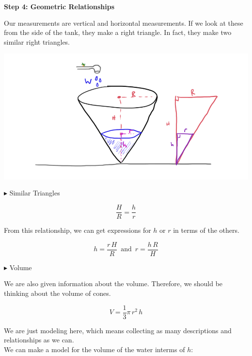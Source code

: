 \documentclass{ximera}
\begin{document}
\textbf{\textcolor{purple!85!blue}{Step 4: Geometric Relationships}}


Our measurements are vertical and horizontal measurements.  If we look at these from the side of the tank, they make a right triangle.  In fact, they make two similar right triangles.






\begin{image}
\includegraphics{pics/cone_5.png}
\end{image}




$\blacktriangleright$ Similar Triangles



\[
\frac{H}{R} = \frac{h}{r}
\]


From this relationship, we can get expressions for $h$ or $r$ in terms of the others. 



\[
h = \frac{r \, H}{R} \, \text{ and } \,  r = \frac{h \, R}{H}
\]







$\blacktriangleright$ Volume


We are also given information about the volume.  Therefore, we should be thinking about the volume of cones.

\[
V = \frac{1}{3} \pi \, r^2 \, h
\]







We are just modeling here, which means collecting as many descriptions and relationships as we can. \\




We can make a model for the volume of the water interms of $h$:
\end{document}
